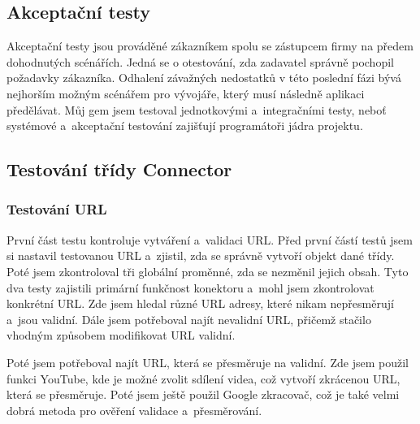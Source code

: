 \subsection{Akceptační testy}
\par Akceptační testy jsou prováděné zákazníkem spolu se zástupcem firmy na předem dohodnutých scénářích. Jedná se o otestování, zda zadavatel správně pochopil požadavky zákazníka. Odhalení závažných nedostatků v této poslední fázi bývá nejhorším možným scénářem pro vývojáře, který musí následně aplikaci předělávat. Můj gem jsem testoval jednotkovými a~integračními testy, neboť systémové a~akceptační testování zajišťují programátoři jádra projektu.


\subsection{Testování třídy Connector}
\subsubsection{Testování URL}
\par První část testu kontroluje vytváření a~validaci URL. Před první částí testů jsem si nastavil testovanou URL a~zjistil, zda se správně vytvoří objekt dané třídy. Poté jsem zkontroloval tři globální proměnné, zda se nezměnil jejich obsah. Tyto dva testy zajistili primární funkčnost konektoru a~mohl jsem zkontrolovat konkrétní URL. Zde jsem hledal různé URL adresy, které nikam nepřesměrují a~jsou validní. Dále jsem potřeboval najít nevalidní URL, přičemž stačilo vhodným způsobem modifikovat URL validní. 
\par Poté jsem potřeboval najít URL, která se přesměruje na validní. Zde jsem použil funkci YouTube, kde je možné zvolit sdílení videa, což vytvoří zkrácenou URL, která se přesměruje. Poté jsem ještě použil Google zkracovač, což je také velmi dobrá metoda pro ověření validace a~přesměrování.
